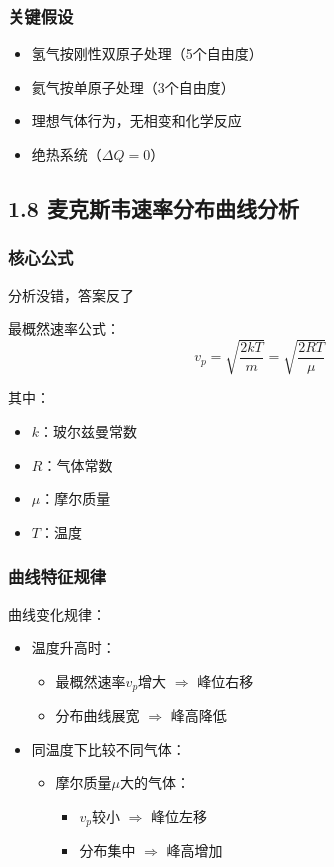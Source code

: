 \documentclass{article}
\begin{document}
{\subsubsection*{关键假设}
\begin{itemize}
    \item 氢气按刚性双原子处理（5个自由度）
    \item 氦气按单原子处理（3个自由度）
    \item 理想气体行为，无相变和化学反应
    \item 绝热系统（$\Delta Q = 0$）
\end{itemize}


\subsection*{1.8 麦克斯韦速率分布曲线分析}

\subsubsection*{核心公式}
{\color{red}分析没错，答案反了}

最概然速率公式：
\[
v_p = \sqrt{\frac{2kT}{m}} = \sqrt{\frac{2RT}{\mu}}
\]

其中：
\begin{itemize}
    \item \(k\)：玻尔兹曼常数
    \item \(R\)：气体常数
    \item \(\mu\)：摩尔质量
    \item \(T\)：温度
\end{itemize}

\subsubsection*{曲线特征规律}

\noindent 曲线变化规律：
\begin{itemize}
    \item 温度升高时：
    \begin{itemize}
        \item 最概然速率\(v_p\)增大 \(\Rightarrow\) 峰位右移
        \item 分布曲线展宽 \(\Rightarrow\) 峰高降低
    \end{itemize}
    
    \item 同温度下比较不同气体：
    \begin{itemize}
        \item 摩尔质量\(\mu\)大的气体：
        \begin{itemize}
            \item \(v_p\)较小 \(\Rightarrow\) 峰位左移
            \item 分布集中 \(\Rightarrow\) 峰高增加
        \end{itemize}
    \end{itemize}
\end{itemize}

}
\end{document}
